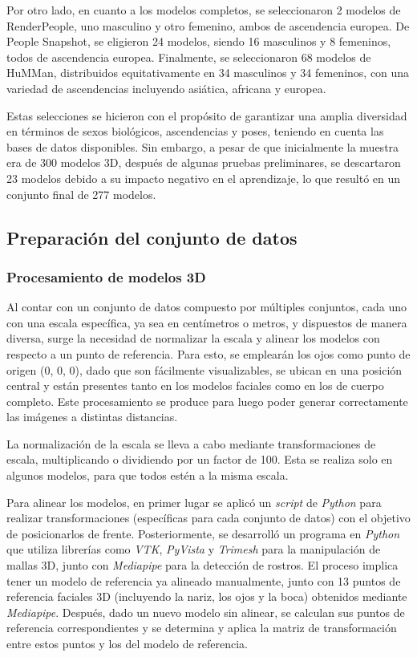Por otro lado, en cuanto a los modelos completos, se seleccionaron 2 modelos de RenderPeople, uno masculino y otro femenino, ambos de ascendencia europea. De People Snapshot, se eligieron 24 modelos, siendo 16 masculinos y 8 femeninos, todos de ascendencia europea. Finalmente, se seleccionaron 68 modelos de HuMMan, distribuidos equitativamente en 34 masculinos y 34 femeninos, con una variedad de ascendencias incluyendo asiática, africana y europea.

Estas selecciones se hicieron con el propósito de garantizar una amplia diversidad en términos de sexos biológicos, ascendencias y poses, teniendo en cuenta las bases de datos disponibles. Sin embargo, a pesar de que inicialmente la muestra era de 300 modelos 3D, después de algunas pruebas preliminares, se descartaron 23 modelos debido a su impacto negativo en el aprendizaje, lo que resultó en un conjunto final de 277 modelos.

\subsection{Preparación del conjunto de datos}

\subsubsection{Procesamiento de modelos 3D}

Al contar con un conjunto de datos compuesto por múltiples conjuntos, cada uno con una escala específica, ya sea en centímetros o metros, y dispuestos de manera diversa, surge la necesidad de normalizar la escala y alinear los modelos con respecto a un punto de referencia. Para esto, se emplearán los ojos como punto de origen (0, 0, 0), dado que son fácilmente visualizables, se ubican en una posición central y están presentes tanto en los modelos faciales como en los de cuerpo completo. Este procesamiento se produce para luego poder generar correctamente las imágenes a distintas distancias.

La normalización de la escala se lleva a cabo mediante transformaciones de escala, multiplicando o dividiendo por un factor de 100. Esta se realiza solo en algunos modelos, para que todos estén a la misma escala.

Para alinear los modelos, en primer lugar se aplicó un \textit{script} de \textit{Python} para realizar transformaciones (específicas para cada conjunto de datos) con el objetivo de posicionarlos de frente. Posteriormente, se desarrolló un programa en \textit{Python} que utiliza librerías como \textit{VTK}, \textit{PyVista} y \textit{Trimesh} para la manipulación de mallas 3D, junto con \textit{Mediapipe} para la detección de rostros. El proceso implica tener un modelo de referencia ya alineado manualmente, junto con 13 puntos de referencia faciales 3D (incluyendo la nariz, los ojos y la boca) obtenidos mediante \textit{Mediapipe}. Después, dado un nuevo modelo sin alinear, se calculan sus puntos de referencia correspondientes y se determina y aplica la matriz de transformación entre estos puntos y los del modelo de referencia.

